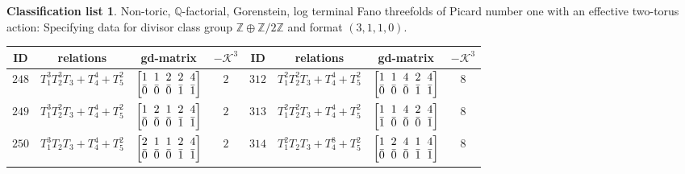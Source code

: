 \documentclass[10pt,a4paper]{amsart}
\theoremstyle{definition}
\newtheorem{class-list}[thm]{Classification list}
\def\ZZ{{\mathbb Z}}
\def\QQ{{\mathbb Q}}
\numberwithin{equation}{section}
\begin{document}
\begin{class-list}
Non-toric, $\QQ$-factorial, Gorenstein, log terminal Fano
threefolds of Picard number one with an effective two-torus action:
Specifying data for divisor class group $\ZZ\oplus \ZZ/2\ZZ$ and
format $(3,1,1,0)$.
\begin{table}[h!]\centering\setlength{\tabcolsep}{3.5pt}
\renewcommand{\arraystretch}{1.3}\small\tabulinesep=1mm
\begin{tabu}{c|c|c|c||c|c|c|c}
\hline
ID&relations&gd-matrix&$-\mathcal{K}^3$&ID&relations&gd-matrix&$-\mathcal{K}^3$
\\
\hline
${248}$&${T_{1}^{3}T_{2}^{3}T_{3}+T_{4}^{4}+T_{5}^{2}}$
&$\arraycolsep=1mm\begin{bmatrix}{1} & {1} & {2} & {2} & {4} \\ {\bar{0}} & {\bar{0}} & {\bar{0}} & {\bar{1}} & {\bar{1}}\end{bmatrix}$&${2}$
&${312}$&${T_{1}^{2}T_{2}^{2}T_{3}+T_{4}^{4}+T_{5}^{2}}$
&$\arraycolsep=1mm\begin{bmatrix}{1} & {1} & {4} & {2} & {4} \\ {\bar{0}} & {\bar{0}} & {\bar{0}} & {\bar{1}} & {\bar{1}}\end{bmatrix}$&${8}$
\\
\hline
${249}$&${T_{1}^{3}T_{2}^{2}T_{3}+T_{4}^{4}+T_{5}^{2}}$
&$\arraycolsep=1mm\begin{bmatrix}{1} & {2} & {1} & {2} & {4} \\ {\bar{0}} & {\bar{0}} & {\bar{0}} & {\bar{1}} & {\bar{1}}\end{bmatrix}$&${2}$
&${313}$&${T_{1}^{2}T_{2}^{2}T_{3}+T_{4}^{4}+T_{5}^{2}}$
&$\arraycolsep=1mm\begin{bmatrix}{1} & {1} & {4} & {2} & {4} \\ {\bar{1}} & {\bar{0}} & {\bar{0}} & {\bar{0}} & {\bar{1}}\end{bmatrix}$&${8}$
\\
\hline
${250}$&${T_{1}^{3}T_{2}T_{3}+T_{4}^{4}+T_{5}^{2}}$
&$\arraycolsep=1mm\begin{bmatrix}{2} & {1} & {1} & {2} & {4} \\ {\bar{0}} & {\bar{0}} & {\bar{0}} & {\bar{1}} & {\bar{1}}\end{bmatrix}$&${2}$
&${314}$&${T_{1}^{2}T_{2}T_{3}+T_{4}^{8}+T_{5}^{2}}$
&$\arraycolsep=1mm\begin{bmatrix}{1} & {2} & {4} & {1} & {4} \\ {\bar{0}} & {\bar{0}} & {\bar{0}} & {\bar{1}} & {\bar{1}}\end{bmatrix}$&${8}$

\end{tabu}
\end{table}
\end{class-list}
\end{document}
